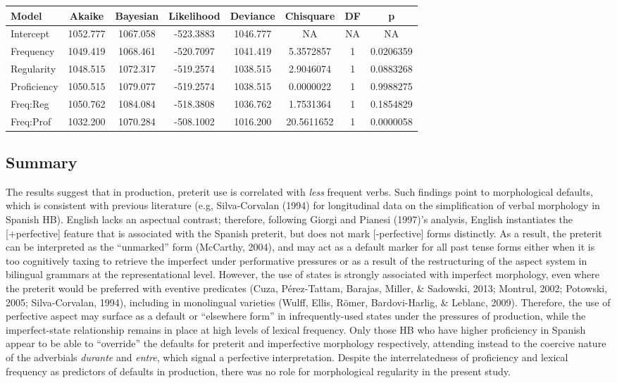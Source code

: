 \documentclass[
  english,
  man,floatsintext]{apa6}
\begin{document}
\begin{tabular}{l|c|c|c|c|c|c|c}
\hline
Model & Akaike & Bayesian & Likelihood & Deviance & Chisquare & DF & p\\
\hline
Intercept & 1052.777 & 1067.058 & -523.3883 & 1046.777 & NA & NA & NA\\
\hline
Frequency & 1049.419 & 1068.461 & -520.7097 & 1041.419 & 5.3572857 & 1 & 0.0206359\\
\hline
Regularity & 1048.515 & 1072.317 & -519.2574 & 1038.515 & 2.9046074 & 1 & 0.0883268\\
\hline
Proficiency & 1050.515 & 1079.077 & -519.2574 & 1038.515 & 0.0000022 & 1 & 0.9988275\\
\hline
Freq:Reg & 1050.762 & 1084.084 & -518.3808 & 1036.762 & 1.7531364 & 1 & 0.1854829\\
\hline
Freq:Prof & 1032.200 & 1070.284 & -508.1002 & 1016.200 & 20.5611652 & 1 & 0.0000058\\
\hline
\end{tabular}

\hypertarget{summary}{%
\subsection{Summary}\label{summary}}

The results suggest that in production, preterit use is correlated with \emph{less} frequent verbs. Such findings point to morphological defaults, which is consistent with previous literature (e.g, Silva-Corvalan (1994) for longitudinal data on the simplification of verbal morphology in Spanish HB). English lacks an aspectual contrast; therefore, following Giorgi and Pianesi (1997)'s analysis, English instantiates the {[}+perfective{]} feature that is associated with the Spanish preterit, but does not mark {[}-perfective{]} forms distinctly. As a result, the preterit can be interpreted as the ``unmarked'' form (McCarthy, 2004), and may act as a default marker for all past tense forms either when it is too cognitively taxing to retrieve the imperfect under performative pressures or as a result of the restructuring of the aspect system in bilingual grammars at the representational level. However, the use of states is strongly associated with imperfect morphology, even where the preterit would be preferred with eventive predicates (Cuza, Pérez-Tattam, Barajas, Miller, \& Sadowski, 2013; Montrul, 2002; Potowski, 2005; Silva-Corvalan, 1994), including in monolingual varieties (Wulff, Ellis, Römer, Bardovi-Harlig, \& Leblanc, 2009). Therefore, the use of perfective aspect may surface as a default or ``elsewhere form'' in infrequently-used states under the pressures of production, while the imperfect-state relationship remains in place at high levels of lexical frequency. Only those HB who have higher proficiency in Spanish appear to be able to ``override'' the defaults for preterit and imperfective morphology respectively, attending instead to the coercive nature of the adverbials \emph{durante} and \emph{entre}, which signal a perfective interpretation. Despite the interrelatedness of proficiency and lexical frequency as predictors of defaults in production, there was no role for morphological regularity in the present study.
\end{document}
